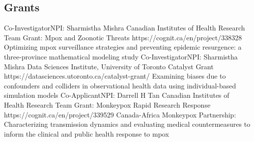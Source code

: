 \subsection{Grants}
  {Co-Investigator}{NPI: Sharmistha Mishra }
  {Canadian Institutes of Health Research}
  {Team Grant: Mpox and Zoonotic Threats}
  {https://cognit.ca/en/project/338328}
  {Optimizing mpox surveillance strategies and preventing epidemic resurgence: a three-province mathematical modeling study}
  {Co-Investigator}{NPI: Sharmistha Mishra }
  {Data Sciences Institute, University of Toronto}
  {Catalyst Grant}
  {https://datasciences.utoronto.ca/catalyst-grant/}
  {Examining biases due to confounders and colliders in observational health data using individual-based simulation models}
  {Co-Applicant}{NPI: Darrell H Tan }
  {Canadian Institutes of Health Research}
  {Team Grant: Monkeypox Rapid Research Response}
  {https://cognit.ca/en/project/339529}
  {Canada-Africa Monkeypox Partnership: Characterizing transmission dynamics and evaluating medical countermeasures to inform the clinical and public health response to mpox}
